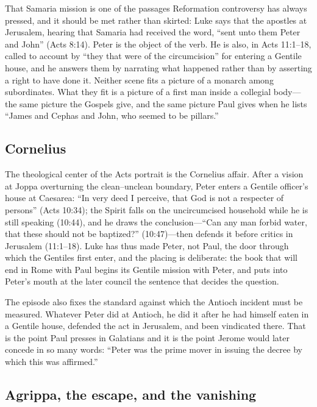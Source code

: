 That Samaria mission is one of the passages Reformation controversy has
always pressed, and it should be met rather than skirted: Luke says that the
apostles at Jerusalem, hearing that Samaria had received the word, ``sent
unto them Peter and John'' (Acts 8:14). Peter is the object of the verb. He
is also, in Acts 11:1--18, called to account by ``they that were of the
circumcision'' for entering a Gentile house, and he answers them by narrating
what happened rather than by asserting a right to have done it. Neither scene
fits a picture of a monarch among subordinates. What they fit is a picture of
a first man inside a collegial body---the same picture the Gospels give, and
the same picture Paul gives when he lists ``James and Cephas and John, who
seemed to be pillars.''

\subsection{Cornelius}

The theological center of the Acts portrait is the Cornelius affair. After
a vision at Joppa overturning the clean--unclean boundary, Peter enters a
Gentile officer's house at Caesarea: ``In very deed I perceive, that God is
not a respecter of persons'' (Acts 10:34); the Spirit falls on the
uncircumcised household while he is still speaking (10:44), and he draws
the conclusion---``Can any man forbid water, that these should not be
baptized?'' (10:47)---then defends it before critics in Jerusalem
(11:1--18). Luke has thus made Peter, not Paul, the door through which the
Gentiles first enter, and the placing is deliberate: the book that will end
in Rome with Paul begins its Gentile mission with Peter, and puts into
Peter's mouth at the later council the sentence that decides the question.

The episode also fixes the standard against which the Antioch incident must
be measured. Whatever Peter did at Antioch, he did it after he had himself
eaten in a Gentile house, defended the act in Jerusalem, and been vindicated
there. That is the point Paul presses in Galatians and it is the point Jerome
would later concede in so many words: ``Peter was the prime mover in issuing
the decree by which this was affirmed.''

\subsection{Agrippa, the escape, and the vanishing}

